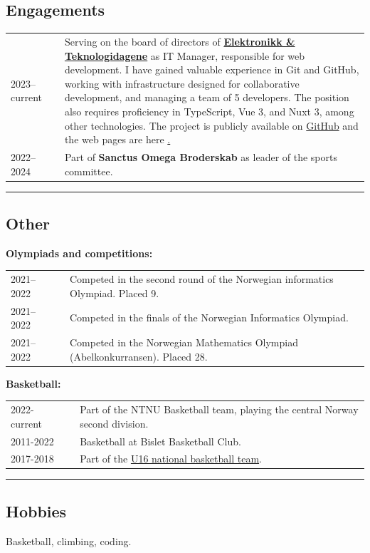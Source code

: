 \documentclass[10pt]{article}
\newlength{\cw}
\newlength{\cwl}
\begin{document}
\subsection*{Engagements}
\begin{tabular}{p{\cw} @{:}l p{\cwl}}
  2023--current & & Serving on the board of directors of \textbf{\href{https://www.etdagen.no/}{Elektronikk \& Teknologidagene}} as IT Manager, responsible for web development. I have gained valuable experience in Git and GitHub, working with infrastructure designed for collaborative development, and managing a team of 5 developers. The position also requires proficiency in TypeScript, Vue 3, and Nuxt 3, among other technologies. The project is publicly available on \href{https://github.com/et-dagen}{GitHub} and the web pages are here \href{https://www.etdagen.no/}. 
  \\
  2022--2024 & & Part of \textbf{Sanctus Omega Broderskab} as leader of the sports committee.\\
\end{tabular}
\vspace{0.1cm}
\hrule
\vspace{0.1cm}

\newpage

\subsection*{Other}
\textbf{Olympiads and competitions:}

\begin{tabular}{p{\cw} @{:}l p{\cwl}}
  2021--2022 & & Competed in the second round of the Norwegian informatics Olympiad. Placed 9.\\
  2021--2022 & & Competed in the finals of the Norwegian Informatics Olympiad.\\
  2021--2022 & & Competed in the Norwegian Mathematics Olympiad (Abelkonkurransen). Placed 28.\\
\end{tabular}

\textbf{Basketball:}

\begin{tabular}{p{\cw} @{:}l p{\cwl}}
  2022-current & & Part of the NTNU Basketball team, playing the central Norway second division.\\
  2011-2022 & & Basketball at Bislet Basketball Club. \\
  2017-2018 & & Part of the \href{https://www.basket.no/landslag/u16-menn/}{U16 national basketball team}. \\
\end{tabular}
\vspace{0.1cm}
\hrule
\vspace{0.1cm}

\subsection*{Hobbies}
Basketball, climbing, coding. 
\end{document}
